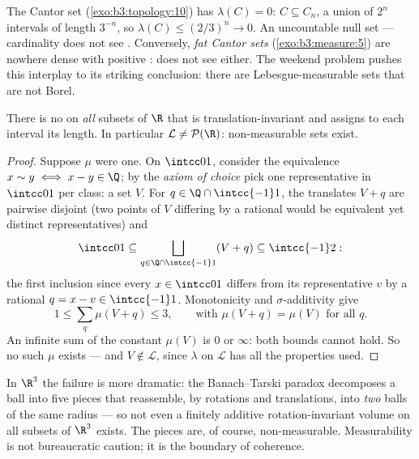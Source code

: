 \begin{example}\label{ex:b3:measure:cantor}
The Cantor set (\cref{exo:b3:topology:10}) has $\lambda(C) = 0$:
$C \subseteq C_n$, a union of $2^n$ intervals of length
$3^{-n}$, so $\lambda(C) \leq (2/3)^n \to 0$. An uncountable
null set --- cardinality does not see . Conversely,
\emph{fat Cantor sets} (\cref{exo:b3:measure:5}) are nowhere
dense with positive :  does not see 
either. The weekend problem pushes this interplay to its
striking conclusion: there are Lebesgue-measurable sets that
are not Borel.
\end{example}

\begin{theorem}[Vitali]\label{thm:b3:measure:vitali}
There is no  on \emph{all} subsets of $\R$ that is
translation-invariant and assigns to each interval its length.
In particular $\mathcal L \neq \mathcal P(\R)$: non-measurable
sets exist.
\end{theorem}

\begin{proof}
Suppose $\mu$ were one. On $\intcc01$, consider the equivalence
$x \sim y \iff x - y \in \Q$; by the \emph{axiom of choice}
pick one representative in $\intcc01$ per class: a set $V$. For
$q \in \Q\cap\intcc{-1}1$, the translates $V + q$ are pairwise
disjoint (two points of $V$ differing by a rational would be
equivalent yet distinct representatives) and
\[
\intcc01 \subseteq \bigsqcup_{q \in \Q\cap\intcc{-1}1}(V + q)
\subseteq \intcc{-1}2 :
\]
the first inclusion since every $x \in \intcc01$ differs from
its representative $v$ by a rational $q = x - v \in
\intcc{-1}1$. Monotonicity and $\sigma$-additivity give
\[
1 \leq \sum_{q}\mu(V + q) \leq 3,
\qquad\text{with } \mu(V + q) = \mu(V) \text{ for all } q .
\]
An infinite sum of the constant $\mu(V)$ is $0$ or $\infty$:
both bounds cannot hold. So no such $\mu$ exists --- and $V
\notin \mathcal L$, since $\lambda$ on $\mathcal L$ has all the
properties used.
\end{proof}

\begin{remark}\label{rem:b3:measure:banachtarski}
In $\R^3$ the failure is more dramatic: the Banach--Tarski
paradox decomposes a ball into five pieces that reassemble, by
rotations and translations, into \emph{two} balls of the same
radius --- so not even a finitely additive rotation-invariant
volume on all subsets of $\R^3$ exists. The pieces are, of
course, non-measurable. Measurability is not bureaucratic
caution; it is the boundary of coherence.
\end{remark}

